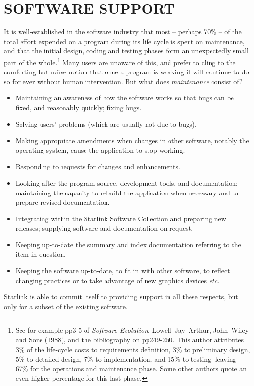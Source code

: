 \documentclass[nolof,11pt,noabs]{starlink}
\begin{document}
\section{SOFTWARE SUPPORT}
It is well-established in the software industry that
most -- perhaps 70\% -- of the total effort expended on
a program during its life cycle is spent on maintenance,
and that the initial design, coding and testing phases
form an unexpectedly small part of the
whole.\footnote{See for example pp3-5 of \textit{Software Evolution}, Lowell~Jay~Arthur,
John~Wiley and Sons (1988), and the bibliography on pp249-250.
This author attributes 3\% of the life-cycle costs to requirements
definition, 3\% to preliminary design, 5\% to detailed design,
7\% to implementation, and 15\% to testing, leaving 67\% for the operations
and maintenance phase.  Some other authors quote an even higher
percentage for this last phase.}
Many users are
unaware of this, and prefer to cling to the comforting but na\"{\i}ve
notion that
once a program is working it will continue to do so for
ever without human intervention.  But what does
\textit{maintenance} consist of?
\begin{itemize}
\item Maintaining an awareness of how the software works so that bugs can
be fixed, and reasonably quickly;  fixing bugs.
\item Solving users' problems (which are usually not due to bugs).
\item Making appropriate amendments when changes in other
software, notably the operating system, cause the application
to stop working.
\item Responding to requests for changes and enhancements.
\item Looking after the program source, development tools,
and documentation;  maintaining the capacity to
rebuild the application when necessary and to prepare
revised documentation.
\item Integrating within the Starlink Software Collection and
preparing new releases;  supplying software and documentation on request.
\item Keeping up-to-date the summary and index documentation referring
to the item in question.
\item Keeping the software up-to-date,
to fit in with other software, to reflect changing practices or
to take advantage of new graphics devices \textit{etc}.
\end{itemize}
Starlink is able to commit itself to providing support in
all these respects, but only for a subset of the existing software.
\end{document}

